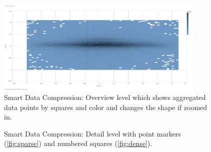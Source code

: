 \begin{figure}[H]
    \centering
    \includegraphics[width=10cm]{src/images/SmartDataCompression}
    \caption[Smart Data Compression: Overview]{Smart Data Compression: Overview level which shows aggregated data points by squares and color and changes the shape if zoomed in.}
    \label{fig:smartdatacompression}
\end{figure}

\begin{figure}[H]
    \centering
    \qquad
    \caption[Smart Data Compression: Detail]{Smart Data Compression: Detail level with point markers (\ref{fig:sparse}) and numbered squares (\ref{fig:dense}).}
    \label{fig:smartdatacompression2}
\end{figure}

